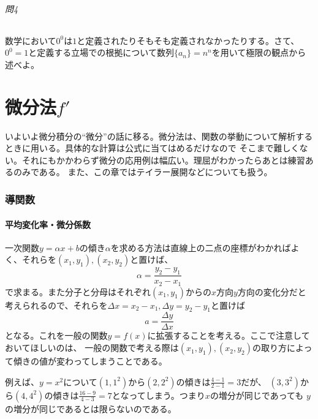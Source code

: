 \documentclass[a4j,dvipdfmx]{jsarticle}
\newcommand{\linktoMOKUZI}{\vspace{\stretch{1}}\fbox{\centerline{\hyperref[目次]{目次に戻る}}}}
\begin{document}
                \paragraph{問4}
                    数学において$0^0$は$1$と定義されたりそもそも定義されなかったりする。さて、$0^0=1$と定義する立場での根拠について数列$\{a_n\}=n^n$を用いて極限の観点から述べよ。
                
                \linktoMOKUZI
                
    \clearpage
    \part{微分法$f'$}
    \begin{screen}
        いよいよ微分積分の``微分''の話に移る。微分法は、関数の挙動について解析するときに用いる。具体的な計算は公式に当てはめるだけなので
        そこまで難しくない。それにもかかわらず微分の応用例は幅広い。理屈がわかったらあとは練習あるのみである。
        また、この章ではテイラー展開などについても扱う。
    \end{screen}
    \clearpage
    \section{導関数}
        \subsection{平均変化率・微分係数}
            一次関数$y=\alpha x+b$の傾き$\alpha$を求める方法は直線上の二点の座標がわかればよく、それらを$(x_1,y_1),(x_2,y_2)$と置けば、
            \begin{equation}
                \alpha=\frac{y_2-y_1}{x_2-x_1}
            \end{equation}
            で求まる。また分子と分母はそれぞれ$(x_1,y_1)$からの$x$方向$y$方向の変化分だと考えられるので、それらを$\Delta x=x_2-x_1,\Delta y=y_2-y_1$と置けば
            \begin{equation}
                a= \frac{\Delta y}{\Delta x}
            \end{equation}
            となる。これを一般の関数$y=f(x)$に拡張することを考える。ここで注意しておいてほしいのは、
            一般の関数で考える際は$(x_1,y_1),(x_2,y_2)$の取り方によって傾きの値が変わってしまうことである。

            例えば、$y=x^2$について$(1,1^2)$から$(2,2^2)$の傾きは$\frac{4-1}{2-1}=3$だが、
            $(3,3^2)$から$(4,4^2)$の傾きは$\frac{16-9}{4-3}=7$となってしまう。つまり$x$の増分が同じであっても
            $y$の増分が同じであるとは限らないのである。
\end{document}
